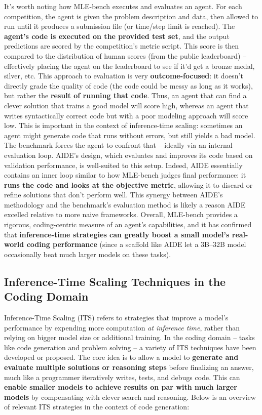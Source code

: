 It’s worth noting how MLE-bench executes and evaluates an agent. For each competition, the agent is given the problem description and data, then allowed to run until it produces a submission file (or time/step limit is reached). The \textbf{agent’s code is executed on the provided test set}, and the output predictions are scored by the competition’s metric script. This score is then compared to the distribution of human scores (from the public leaderboard) – effectively placing the agent on the leaderboard to see if it’d get a bronze medal, silver, etc. This approach to evaluation is very \textbf{outcome-focused}: it doesn’t directly grade the quality of code (the code could be messy as long as it works), but rather the \textbf{result of running that code}. Thus, an agent that can find a clever solution that trains a good model will score high, whereas an agent that writes syntactically correct code but with a poor modeling approach will score low. This is important in the context of inference-time scaling: sometimes an agent might generate code that runs without errors, but still yields a bad model. The benchmark forces the agent to confront that – ideally via an internal evaluation loop. AIDE’s design, which evaluates and improves its code based on validation performance, is well-suited to this setup. Indeed, AIDE essentially contains an inner loop similar to how MLE-bench judges final performance: it \textbf{runs the code and looks at the objective metric}, allowing it to discard or refine solutions that don’t perform well. This synergy between AIDE’s methodology and the benchmark’s evaluation method is likely a reason AIDE excelled relative to more naive frameworks. Overall, MLE-bench provides a rigorous, coding-centric measure of an agent’s capabilities, and it has confirmed that \textbf{inference-time strategies can greatly boost a small model’s real-world coding performance} (since a scaffold like AIDE let a 3B–32B model occasionally beat much larger models on these tasks).

\subsection{Inference-Time Scaling Techniques in the Coding Domain}

Inference-Time Scaling (ITS) refers to strategies that improve a model’s performance by expending more computation \textit{at inference time}, rather than relying on bigger model size or additional training. In the coding domain – tasks like code generation and problem solving – a variety of ITS techniques have been developed or proposed. The core idea is to allow a model to \textbf{generate and evaluate multiple solutions or reasoning steps} before finalizing an answer, much like a programmer iteratively writes, tests, and debugs code. This can \textbf{enable smaller models to achieve results on par with much larger models} by compensating with clever search and reasoning. Below is an overview of relevant ITS strategies in the context of code generation:

